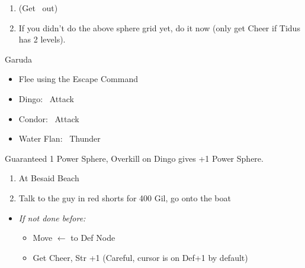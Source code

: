 \begin{enumerate}[resume]
    \item \formation{\tidus}{\yuna}{\lulu} (Get \wakka\ out)
    \item If you didn't do the above sphere grid yet, do it now (only get Cheer if Tidus has 2 levels).
\end{enumerate}
\begin{battle}{Garuda}
    \begin{itemize}
        \item Flee using the Escape Command
    \end{itemize}
\end{battle}
\begin{encounters}
    \begin{itemize}
        \item Dingo: \tidus\ Attack
        \item Condor: \wakka\ Attack
        \item Water Flan: \lulu\ Thunder
    \end{itemize}
    Guaranteed 1 Power Sphere, Overkill on Dingo gives +1 Power Sphere.
\end{encounters}
\begin{enumerate}[resume]
    \item At Besaid Beach \save
    \item Talk to the guy in red shorts for 400 Gil, go onto the boat
\end{enumerate}
\begin{spheregrid}
    \begin{itemize}
        \item \textit{If not done before:}
        \begin{itemize}
            \item Move $\leftarrow$ to Def Node
            \item Get Cheer, Str +1 (Careful, cursor is on Def+1 by default)
        \end{itemize}
    \end{itemize}
\end{spheregrid}
\winnp\lossnp\bothnp
